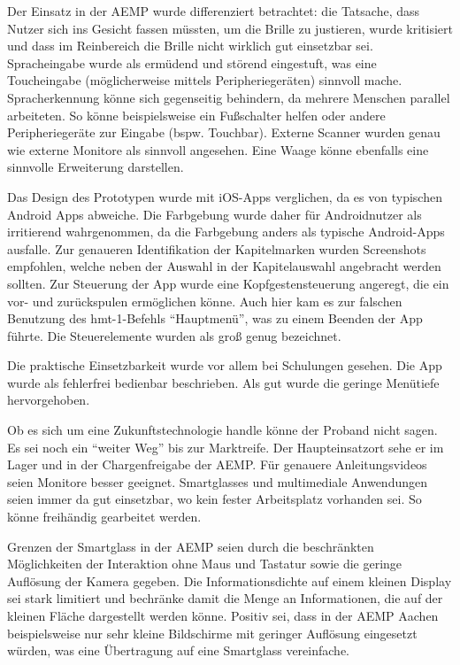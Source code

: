 Der Einsatz in der AEMP wurde differenziert betrachtet: die Tatsache, dass Nutzer sich ins Gesicht fassen müssten, um die Brille zu justieren, wurde kritisiert und dass im Reinbereich die Brille nicht wirklich gut einsetzbar sei. Spracheingabe wurde als ermüdend und störend eingestuft, was eine Toucheingabe (möglicherweise mittels Peripheriegeräten) sinnvoll mache. Spracherkennung könne sich gegenseitig behindern, da mehrere Menschen parallel arbeiteten. So könne beispielsweise ein Fußschalter helfen oder andere Peripheriegeräte zur Eingabe (bspw. Touchbar). Externe Scanner wurden genau wie externe Monitore als sinnvoll angesehen. Eine Waage könne ebenfalls eine sinnvolle Erweiterung darstellen.

Das Design des Prototypen wurde mit iOS-Apps verglichen, da es von typischen Android Apps abweiche. Die Farbgebung wurde daher für Androidnutzer als irritierend wahrgenommen, da die Farbgebung anders als typische Android-Apps ausfalle. Zur genaueren Identifikation der Kapitelmarken wurden Screenshots empfohlen, welche neben der Auswahl in der Kapitelauswahl angebracht werden sollten. Zur Steuerung der App wurde eine Kopfgestensteuerung angeregt, die ein vor- und zurückspulen ermöglichen könne. Auch hier kam es zur falschen Benutzung des hmt-1-Befehls \enquote{Hauptmenü}, was zu einem Beenden der App führte. Die Steuerelemente wurden als groß genug bezeichnet.

Die praktische Einsetzbarkeit wurde vor allem bei Schulungen gesehen. Die App wurde als fehlerfrei bedienbar beschrieben. Als gut wurde die geringe Menütiefe hervorgehoben.

Ob es sich um eine Zukunftstechnologie handle könne der Proband nicht sagen. Es sei noch ein \enquote{weiter Weg} bis zur Marktreife. Der Haupteinsatzort sehe er im Lager und in der Chargenfreigabe der AEMP. Für genauere Anleitungsvideos seien Monitore besser geeignet. Smartglasses und multimediale Anwendungen seien immer da gut einsetzbar, wo kein fester Arbeitsplatz vorhanden sei. So könne freihändig gearbeitet werden.

Grenzen der Smartglass in der AEMP seien durch die beschränkten Möglichkeiten der Interaktion ohne Maus und Tastatur sowie die geringe Auflösung der Kamera gegeben. Die Informationsdichte auf einem kleinen Display sei stark limitiert und bechränke damit die Menge an Informationen, die auf der kleinen Fläche dargestellt werden könne. Positiv sei, dass in der AEMP Aachen beispielsweise nur sehr kleine Bildschirme mit geringer Auflösung eingesetzt würden, was eine Übertragung auf eine Smartglass vereinfache.

